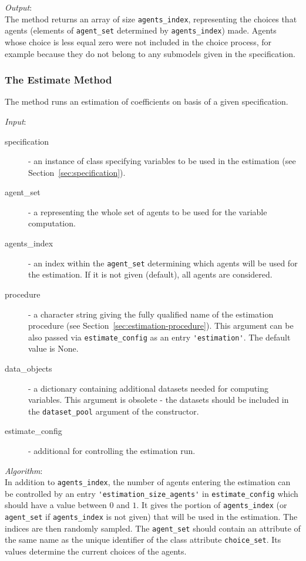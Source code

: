 {{\it Output}:~\\[1mm]
The method returns an array of size \verb|agents_index|, representing the
choices that agents (elements of \verb|agent_set| determined by
\verb|agents_index|) made. Agents whose choice is less equal zero  were
not included in the choice process, for example because they do not belong to
any submodels given in the specification.

\subsubsection{The Estimate Method}
%
The  method runs an estimation of coefficients \coefficientsindex on basis of
a given specification.

{\it Input}:
\begin{description}
\item[specification] - an instance of class 
  specifying variables \variablesindex to be used in the estimation (see Section~\ref{sec:specification}).
\item[agent_set] - a  \datasetindex representing the whole set of agents
  to be used for the variable \variablesindex computation.
\item[agents_index] - an index within the \verb|agent_set| determining which
  agents will be used for the estimation. If it is not given (default), all agents are
  considered.
\item[procedure] - a character string giving the fully qualified name of the
  estimation procedure (see Section~\ref{sec:estimation-procedure}). This argument can be also passed via
  \verb|estimate_config| as an entry \verb|'estimation'|. The default value is None.
\item[data_objects] - a dictionary containing additional datasets \datasetindex
  needed for computing variables. \variablesindex This argument is obsolete - the datasets should be 
  included in the \verb|dataset_pool| argument of the constructor.
\item[estimate_config] - additional  for controlling the
  estimation run.
\end{description}

{\it Algorithm}:~\\[1mm]
In addition to \verb|agents_index|, the number of agents entering the
estimation can be controlled by an entry \verb|'estimation_size_agents'| in
\verb|estimate_config| which should have a value between $0$ and $1$. It gives
the portion of \verb|agents_index| (or \verb|agent_set| if \verb|agents_index|
is not given) that will be used in the estimation. The indices are then
randomly sampled. The \verb|agent_set| should contain an attribute \attributesindex of the same
name as the unique identifier of the class attribute \attributesindex \verb|choice_set|. Its
values determine the current choices of the agents.

}
